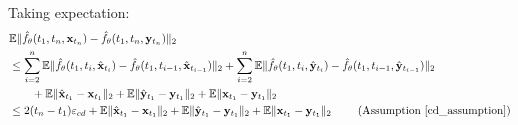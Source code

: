 \documentclass[11pt]{article}
\def\rvx{{\mathbf{x}}}
\def\rvy{{\mathbf{y}}}
\begin{document}
Taking expectation:
\vspace{0.05in}
\begin{align*}
&\mathbb{E}\|\hat{f}_\theta(t_1, t_n, \rvx_{t_n}) - \hat{f}_\theta(t_1, t_n, \rvy_{t_n})\|_2 \\
&\leq \sum_{i=2}^n \mathbb{E}\|\hat{f}_\theta(t_1, t_i, \hat{\rvx}_{t_i} ) - \hat{f}_\theta(t_1, t_{i-1}, \hat{\rvx}_{t_{i-1}})\|_2 \notag + \sum_{i=2}^n \mathbb{E}\|\hat{f}_\theta(t_1, t_i, \hat{\rvy}_{t_i} ) - \hat{f}_\theta(t_1, t_{i-1}, \hat{\rvy}_{t_{i-1}})\|_2 \notag \\
&\qquad + \mathbb{E}\|{\hat{\rvx}_{t_1} - \rvx_{t_1}}\|_2 + \mathbb{E}\|{\hat{\rvy}_{t_1} - \rvy_{t_1}}\|_2 + \mathbb{E}\|{\rvx_{t_1} - \rvy_{t_1}}\|_2 \\
& \leq 2(t_n-t_1)\varepsilon_{cd} + \mathbb{E}\|{\hat{\rvx}_{t_1} - \rvx_{t_1}}\|_2 + \mathbb{E}\|{\hat{\rvy}_{t_1} - \rvy_{t_1}}\|_2 + \mathbb{E}\|{\rvx_{t_1} - \rvy_{t_1}}\|_2 \ \qquad \text{(Assumption \ref{cd_assumption})}
\end{align*}
\end{document}
